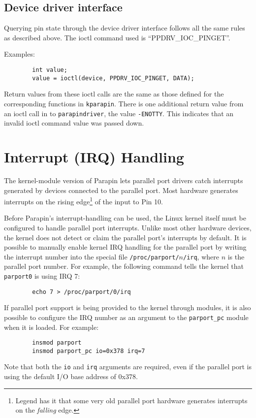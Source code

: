 \documentclass{article}
\begin{document}
\subsection{Device driver interface}

Querying pin state through the device driver interface follows all
the same rules as described above.
The ioctl command used is ``PPDRV\_IOC\_PINGET''.

Examples:
\begin {verbatim}
        int value;
        value = ioctl(device, PPDRV_IOC_PINGET, DATA);
\end{verbatim}

Return values from these ioctl calls are the same as those defined for
the corresponding functions in {\tt kparapin}.  There is one additional
return value from an ioctl call in to {\tt parapindriver}, the value
{\tt -ENOTTY}.  This indicates that an invalid ioctl command value was
passed down.


\section{Interrupt (IRQ) Handling}
\label{interrupts}

The kernel-module version of Parapin lets parallel port drivers catch
interrupts generated by devices connected to the parallel port.  Most
hardware generates interrupts on the rising edge\footnote{Legend has
it that some very old parallel port hardware generates interrupts on
the {\em falling} edge.} of the input to Pin 10.

Before Parapin's interrupt-handling can be used, the Linux kernel
itself must be configured to handle parallel port interrupts.  Unlike
most other hardware devices, the kernel does not detect or claim the
parallel port's interrupts by default.  It is possible to manually
enable kernel IRQ handling for the parallel port by writing the
interrupt number into the special file {\tt /proc/parport/$n$/irq},
where $n$ is the parallel port number.  For example, the following
command tells the kernel that {\tt parport0} is using IRQ 7:
\begin{verbatim}
        echo 7 > /proc/parport/0/irq
\end{verbatim}
If parallel port support is being provided to the kernel through
modules, it is also possible to configure the IRQ number as an
argument to the {\tt parport\_pc} module when it is loaded.  For
example:
\begin{verbatim}
        insmod parport
        insmod parport_pc io=0x378 irq=7
\end{verbatim}
Note that both the {\tt io} and {\tt irq} arguments are required, even
if the parallel port is using the default I/O base address of 0x378.
\end{document}
